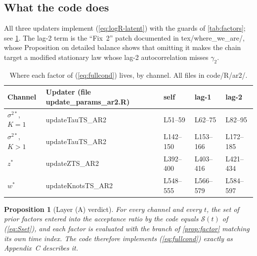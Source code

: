 \documentclass[11pt]{article}
\DeclareRobustCommand{\code}[1]{\texttt{#1}}
\newcommand{\eref}[1]{(\ref{#1})}
\def\bm#1{#1}%
\def\code#1{#1}%
\theoremstyle{plain}
\newtheorem{proposition}{Proposition}[section]
\theoremstyle{definition}
\theoremstyle{remark}
\begin{document}
\subsection{What the code does}

All three updaters implement \eref{eq:logR-latent} with the guards of
\cref{tab:factors}; see \cref{tab:code-map}. The lag-2 term is the ``Fix~2''
patch documented in \code{tex/where\_we\_are/}, whose
Proposition on detailed balance shows that omitting it makes the chain
target a modified stationary law whose lag-2 autocorrelation misses
$\gamma_2$.

\begin{table}[htbp]
\centering
\caption{Where each factor of \eref{eq:fullcond} lives, by channel. All files
in \code{code/R/ar2/}.}
\label{tab:code-map}
\small
\begin{tabular}{@{}l l l l l@{}}
\toprule
Channel & Updater (file \code{update\_params\_ar2.R}) & self & lag-1 & lag-2 \\
\midrule
$\sigma^{2*}$, $K = 1$ & \code{updateTauTS\_AR2}   & L51--59   & L62--75   & L82--95 \\
$\sigma^{2*}$, $K > 1$ & \code{updateTauTS\_AR2}   & L142--150 & L153--166 & L172--185 \\
$z^{*}$                & \code{updateZTS\_AR2}     & L392--400 & L403--416 & L421--434 \\
$\bm{w}^{*}$           & \code{updateKnotsTS\_AR2} & L548--555 & L566--579 & L584--597 \\
\bottomrule
\end{tabular}
\end{table}

\begin{proposition}[Layer (A) verdict]\label{prop:verdictA}
For every channel and every $t$, the set of prior factors entered into the
acceptance ratio by the code equals $\mathcal{S}(t)$ of \eref{eq:Sset}, and
each factor is evaluated with the branch of \cref{prop:factor} matching its
own time index. The code therefore implements \eref{eq:fullcond} exactly as
Appendix~C describes it.
\end{proposition}
\end{document}
